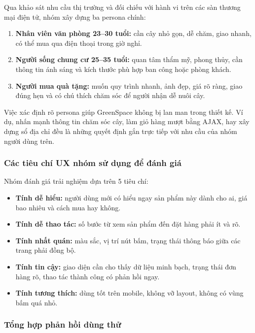\documentclass[11pt, a4paper]{article}
\begin{document}
Qua khảo sát nhu cầu thị trường và đối chiếu với hành vi trên các sàn thương mại điện tử,
nhóm xây dựng ba persona chính:

\begin{enumerate}[leftmargin=*]
    \item \textbf{Nhân viên văn phòng 23--30 tuổi:} cần cây nhỏ gọn, dễ chăm, giao nhanh,
          có thể mua qua điện thoại trong giờ nghỉ.
    \item \textbf{Người sống chung cư 25--35 tuổi:} quan tâm thẩm mỹ, phong thủy, cần thông tin
          ánh sáng và kích thước phù hợp ban công hoặc phòng khách.
    \item \textbf{Người mua quà tặng:} muốn quy trình nhanh, ảnh đẹp, giá rõ ràng, giao đúng hẹn
          và có chú thích chăm sóc để người nhận dễ nuôi cây.
\end{enumerate}

Việc xác định rõ persona giúp GreenSpace không bị lan man trong thiết kế. Ví dụ,
nhấn mạnh thông tin chăm sóc cây, làm giỏ hàng mượt bằng AJAX, hay xây dựng sổ địa chỉ
đều là những quyết định gắn trực tiếp với nhu cầu của nhóm người dùng trên.

\subsubsection{Các tiêu chí UX nhóm sử dụng để đánh giá}

Nhóm đánh giá trải nghiệm dựa trên 5 tiêu chí:

\begin{itemize}[leftmargin=*]
    \item \textbf{Tính dễ hiểu:} người dùng mới có hiểu ngay sản phẩm này dành cho ai,
          giá bao nhiêu và cách mua hay không.
    \item \textbf{Tính dễ thao tác:} số bước từ xem sản phẩm đến đặt hàng phải ít và rõ.
    \item \textbf{Tính nhất quán:} màu sắc, vị trí nút bấm, trạng thái thông báo giữa các trang
          phải đồng bộ.
    \item \textbf{Tính tin cậy:} giao diện cần cho thấy dữ liệu minh bạch, trạng thái đơn hàng rõ,
          thao tác thành công có phản hồi ngay.
    \item \textbf{Tính tương thích:} dùng tốt trên mobile, không vỡ layout, không có vùng bấm quá nhỏ.
\end{itemize}

\subsubsection{Tổng hợp phản hồi dùng thử}
\end{document}
